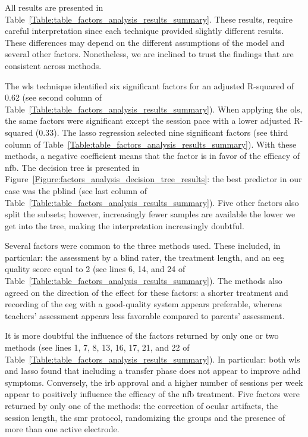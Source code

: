 All results are presented in Table~\ref{Table:table_factors_analysis_results_summary}. These results, require 
careful interpretation since each technique provided slightly different results. These differences 
may depend on the different assumptions of the model and several other factors. Nonetheless, we are inclined to 
trust the findings that are consistent across methods. 

The \gls{wls} technique identified six significant factors for an adjusted R-squared of 0.62 (see second column of 
Table~\ref{Table:table_factors_analysis_results_summary}). 
When applying the \gls{ols}, the same factors were significant except the session pace with a lower adjusted R-squared 
(0.33). The \gls{lasso} regression selected nine significant factors (see third column of 
Table~\ref{Table:table_factors_analysis_results_summary}). With these methods, a negative coefficient means 
that the factor is in favor of the efficacy of \gls{nfb}. The decision tree is presented in Figure~\ref{Figure:factors_analysis_decision_tree_results}: 
the best predictor in our case was the \gls{pblind} (see last column of 
Table~\ref{Table:table_factors_analysis_results_summary}). Five other factors also split the subsets; however, 
increasingly fewer samples are available the lower we get into the tree, making the interpretation increasingly doubtful.  

Several factors were common to the three methods used. These included, in particular: the assessment 
by a blind rater, the treatment length, and an \gls{eeg} quality score equal to 2 (see lines 6, 14, and 24 of 
Table~\ref{Table:table_factors_analysis_results_summary}).
The methods also agreed on the direction of the effect for these factors: 
a shorter treatment and recording of the \gls{eeg} with a good-quality system appears preferable, whereas teachers' assessment appears less favorable 
compared to parents' assessment.

It is more doubtful the influence of the factors returned by only one or two methods (see lines 1, 7, 8, 13, 16, 17, 21, and 22 
of Table~\ref{Table:table_factors_analysis_results_summary}). In particular: 
both \gls{wls} and \gls{lasso} found that including a transfer phase does not appear to improve \gls{adhd} symptoms. 
Conversely, the \gls{irb} approval and a higher number of sessions per week appear to positively influence the efficacy of the \gls{nfb} treatment. 
Five factors were returned by only one of the methods: the correction of ocular artifacts, the session length, the \gls{smr} protocol, 
randomizing the groups and the presence of more than one active electrode.  

